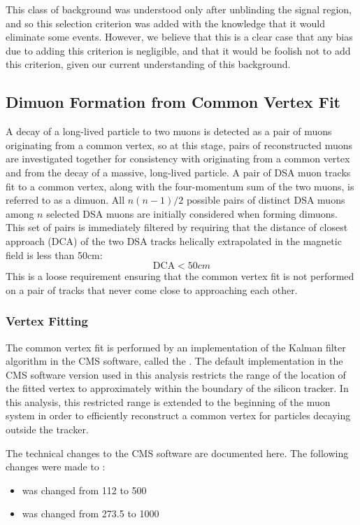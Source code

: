 \pagebreak
This class of background was understood only after unblinding the signal region, and so this selection criterion was added with the knowledge that it would eliminate some events.
However, we believe that this is a clear case that any bias due to adding this criterion is negligible, and that it would be foolish not to add this criterion, given our current understanding of this background.

\subsection{Dimuon Formation from Common Vertex Fit}
\label{sec:dd:DimVertex}
A decay of a long-lived particle to two muons is detected as a pair of muons originating from a common vertex, so at this stage, pairs of reconstructed muons are investigated together for consistency with originating from a common vertex and from the decay of a massive, long-lived particle.
A pair of DSA muon tracks fit to a common vertex, along with the four-momentum sum of the two muons, is referred to as a dimuon.
All $n(n-1)/2$ possible pairs of distinct DSA muons among $n$ selected DSA muons are initially considered when forming dimuons.
This set of pairs is immediately filtered by requiring that the distance of closest approach (DCA) of the two DSA tracks helically extrapolated in the magnetic field is less than 50\unit{cm}:
$$\text{DCA} < 50\unit{cm}$$
This is a loose requirement ensuring that the common vertex fit is not performed on a pair of tracks that never come close to approaching each other.

\subsubsection{Vertex Fitting}
\label{sec:dd:VertexFitting}
The common vertex fit is performed by an implementation of the Kalman filter algorithm in the CMS software, called the  \cite{Fruhwirth:1987fm,Speer:927395}.
The default implementation in the CMS software version used in this analysis restricts the range of the location of the fitted vertex to approximately within the boundary of the silicon tracker.
In this analysis, this restricted range is extended to the beginning of the muon system in order to efficiently reconstruct a common vertex for particles decaying outside the tracker.

The technical changes to the CMS software are documented here.
The following changes were made to :
\begin{itemize}
  \item {} was changed from 112 to 500
  \item {} was changed from 273.5 to 1000
\end{itemize}

